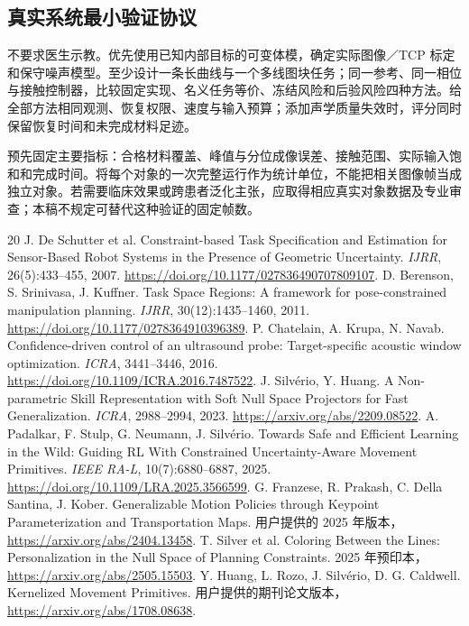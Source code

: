 \documentclass[UTF8,11pt,a4paper,fontset=fandol]{ctexart}
\numberwithin{equation}{section}
\theoremstyle{definition}
\begin{document}
\subsection{真实系统最小验证协议}
不要求医生示教。优先使用已知内部目标的可变体模，确定实际图像／TCP 标定和保守噪声模型。至少设计一条长曲线与一个多线图块任务；同一参考、同一相位与接触控制器，比较固定实现、名义任务等价、冻结风险和后验风险四种方法。给全部方法相同观测、恢复权限、速度与输入预算；添加声学质量失效时，评分同时保留恢复时间和未完成材料足迹。

预先固定主要指标：合格材料覆盖、峰值与分位成像误差、接触范围、实际输入饱和和完成时间。将每个对象的一次完整运行作为统计单位，不能把相关图像帧当成独立对象。若需要临床效果或跨患者泛化主张，应取得相应真实对象数据及专业审查；本稿不规定可替代这种验证的固定帧数。

\begin{thebibliography}{20}\small
{} J. De Schutter et al. Constraint-based Task Specification and Estimation for Sensor-Based Robot Systems in the Presence of Geometric Uncertainty. \emph{IJRR}, 26(5):433--455, 2007. \url{https://doi.org/10.1177/027836490707809107}.
 D. Berenson, S. Srinivasa, J. Kuffner. Task Space Regions: A framework for pose-constrained manipulation planning. \emph{IJRR}, 30(12):1435--1460, 2011. \url{https://doi.org/10.1177/0278364910396389}.
 P. Chatelain, A. Krupa, N. Navab. Confidence-driven control of an ultrasound probe: Target-specific acoustic window optimization. \emph{ICRA}, 3441--3446, 2016. \url{https://doi.org/10.1109/ICRA.2016.7487522}.
 J. Silv\'erio, Y. Huang. A Non-parametric Skill Representation with Soft Null Space Projectors for Fast Generalization. \emph{ICRA}, 2988--2994, 2023. \url{https://arxiv.org/abs/2209.08522}.
 A. Padalkar, F. Stulp, G. Neumann, J. Silv\'erio. Towards Safe and Efficient Learning in the Wild: Guiding RL With Constrained Uncertainty-Aware Movement Primitives. \emph{IEEE RA-L}, 10(7):6880--6887, 2025. \url{https://doi.org/10.1109/LRA.2025.3566599}.
 G. Franzese, R. Prakash, C. Della Santina, J. Kober. Generalizable Motion Policies through Keypoint Parameterization and Transportation Maps. 用户提供的 2025 年版本，\url{https://arxiv.org/abs/2404.13458}.
 T. Silver et al. Coloring Between the Lines: Personalization in the Null Space of Planning Constraints. 2025 年预印本，\url{https://arxiv.org/abs/2505.15503}.
 Y. Huang, L. Rozo, J. Silv\'erio, D. G. Caldwell. Kernelized Movement Primitives. 用户提供的期刊论文版本，\url{https://arxiv.org/abs/1708.08638}.

\end{thebibliography}
\end{document}
